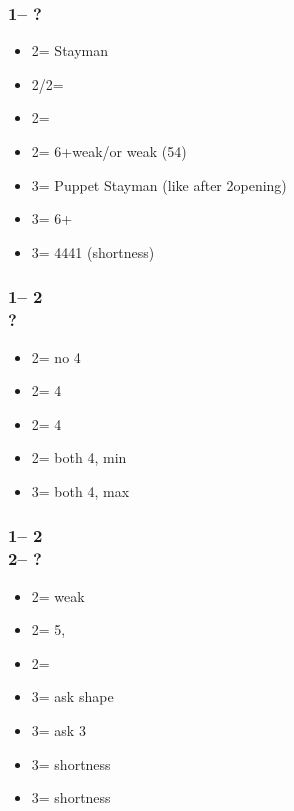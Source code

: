 \documentclass[12pt, a4paper]{report}
\begin{document}
{{        \subsubsection*{1\nt -- ?}
        \begin{itemize}
            \item 2\clubs = Stayman
            \item 2\diams/2\hearts = \then \major
            \item 2\spades = \then \clubs
            \item 2\nt = 6+\diams weak/\gf or \minor weak (54)
            \item 3\clubs = Puppet Stayman (like after 2\nt opening) \imp
            \item 3\diams = 6+\diams\ \inv
            \item 3\major = 4441 (\major shortness) \gf \qq
        \end{itemize}

        \subsubsection*{1\nt -- 2\clubs\\
                        ?}
        \begin{itemize}
            \item 2\diams = no 4\major
            \item 2\hearts = 4\hearts
            \item 2\spades = 4\spades
            \item 2\nt = both 4\major, min
            \item 3\clubs = both 4\major, max
        \end{itemize}

        \subsubsection*{1\nt -- 2\clubs\\
                        2\diams -- ?}
        \begin{itemize}
            \item 2\hearts = \major weak
            \item 2\spades = 5\spades, \inv
            \item 2\nt = \inv
            \item 3\clubs = ask shape
            \item 3\diams = ask 3\major
            \item 3\hearts = \clubs shortness
            \item 3\spades = \diams shortness
        \end{itemize}

}}
\end{document}
